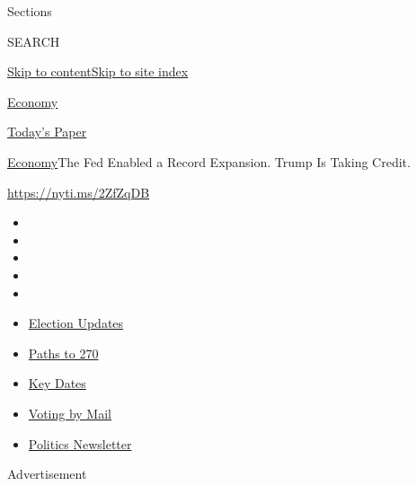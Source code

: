Sections

SEARCH

\protect\hyperlink{site-content}{Skip to
content}\protect\hyperlink{site-index}{Skip to site index}

\href{https://www.nytimes3xbfgragh.onion/section/business/economy}{Economy}

\href{https://myaccount.nytimes3xbfgragh.onion/auth/login?response_type=cookie\&client_id=vi}{}

\href{https://www.nytimes3xbfgragh.onion/section/todayspaper}{Today's
Paper}

\href{/section/business/economy}{Economy}\textbar{}The Fed Enabled a
Record Expansion. Trump Is Taking Credit.

\url{https://nyti.ms/2ZfZqDB}

\begin{itemize}
\item
\item
\item
\item
\item
\end{itemize}

\begin{itemize}
\item
  \href{https://www.nytimes3xbfgragh.onion/live/2020/09/11/us/trump-vs-biden?action=click\&pgtype=Article\&state=default\&region=TOP_BANNER\&context=storylines_menu}{Election
  Updates}
\item
  \href{https://www.nytimes3xbfgragh.onion/interactive/2020/us/elections/election-states-biden-trump.html?action=click\&pgtype=Article\&state=default\&region=TOP_BANNER\&context=storylines_menu}{Paths
  to 270}
\item
  \href{https://www.nytimes3xbfgragh.onion/interactive/2019/us/elections/2020-presidential-election-calendar.html?action=click\&pgtype=Article\&state=default\&region=TOP_BANNER\&context=storylines_menu}{Key
  Dates}
\item
  \href{https://www.nytimes3xbfgragh.onion/interactive/2020/08/31/us/politics/vote-by-mail-deadlines.html?action=click\&pgtype=Article\&state=default\&region=TOP_BANNER\&context=storylines_menu}{Voting
  by Mail}
\item
  \href{https://www.nytimes3xbfgragh.onion/newsletters/politics?action=click\&pgtype=Article\&state=default\&region=TOP_BANNER\&context=storylines_menu}{Politics
  Newsletter}
\end{itemize}

Advertisement

